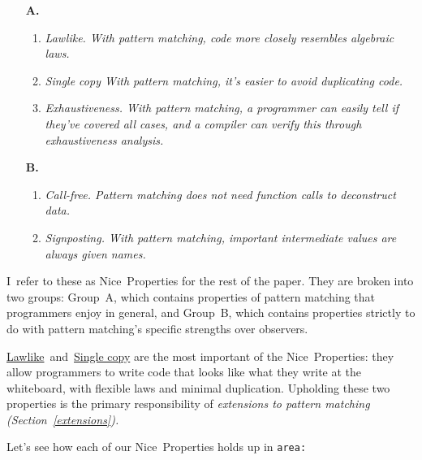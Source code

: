 \documentclass[manuscript,screen,review, 12pt, nonacm]{acmart}
\begin{document}
    \begin{enumerate}
      \item [\textbf{A.}]
      \begin{enumerate}[label=\arabic*]
        \item  \it{Lawlike.} With pattern matching, code more closely
        resembles algebraic laws. 
        \label{p1}
        \item \it{Single copy} With pattern matching, it's easier to avoid
        duplicating code.
        \label{p2}
        \item \it{Exhaustiveness.} With pattern matching, a programmer can
        easily tell if they've covered all cases, and a compiler can verify this
        through \it{exhaustiveness analysis}.
        \label{p5}
    \end{enumerate}

    \item [\textbf{B.}]
    \begin{enumerate}[start=4, label=\arabic*]
      \item \it{Call-free.} Pattern matching does not need function
      calls to deconstruct data. \nolinebreak
      \label{p3}
      \item \it{Signposting.} With pattern matching, important
      intermediate values are always given names. 
      \nolinebreak
      \label{p4}
    \end{enumerate}
  \end{enumerate}

    I~refer to these as Nice~Properties for the rest of the paper. They are broken
    into two groups: Group~A, which contains properties of pattern matching that
    programmers enjoy in general, and Group~B,  which contains properties strictly
    to do with pattern matching's specific strengths over observers. 

    \hyperref[p1]{Lawlike}~and~\hyperref[p2]{Single copy} are the most important
    of the Nice~Properties: they allow programmers to write code that looks like
    what they write at the whiteboard, with flexible laws and minimal
    duplication. Upholding these two properties is the primary responsibility of
    \it{extensions} to pattern matching (Section~\ref{extensions}). 
    
    Let's see how each of our Nice~Properties holds up in \tt{area}: 
    
\end{document}
